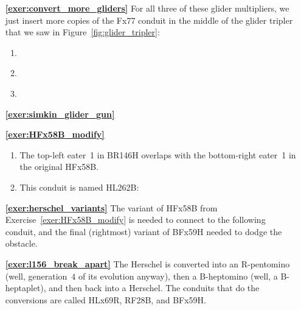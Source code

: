 \begin{multicols}{2}
\begin{itemize}[leftmargin=0em]
		
		\item[\bf\color{ocre}\sffamily\ref{exer:convert_more_gliders}] For all three of these glider multipliers, we just insert more copies of the Fx77 conduit in the middle of the glider tripler that we saw in Figure~\ref{fig:glider_tripler}:
		\begin{enumerate}[leftmargin=1.5em,label=\bf\color{ocre}(\alph*)]
			\item {} \\
			
			\item {} \\
			
			\item {} \\
		\end{enumerate}
	
		\item[\bf\color{ocre}\sffamily\ref{exer:simkin_glider_gun}]  \\
	

		\item[\bf\color{ocre}\sffamily\ref{exer:HFx58B_modify}] \begin{enumerate}[leftmargin=1.5em,label=\bf\color{ocre}(\alph*)]
			\item The top-left eater~1 in BR146H overlaps with the bottom-right eater~1 in the original HFx58B.
			
			\item This conduit is named HL262B:
			\begin{center}
			\end{center}
		\end{enumerate}
	
	
		\item[\bf\color{ocre}\sffamily\ref{exer:herschel_variants}] The variant of HFx58B from Exercise~\ref{exer:HFx58B_modify} is needed to connect to the following conduit, and the final (rightmost) variant of BFx59H needed to dodge the obstacle.
		\begin{center}
		\end{center}
	
	
		\item[\bf\color{ocre}\sffamily\ref{exer:l156_break_apart}] The Herschel is converted into an R-pentomino (well, generation~$4$ of its evolution anyway), then a B-heptomino (well, a B-heptaplet), and then back into a Herschel. The conduits that do the conversions are called HLx69R, RF28B, and BFx59H.
	\end{itemize}
\end{multicols}



